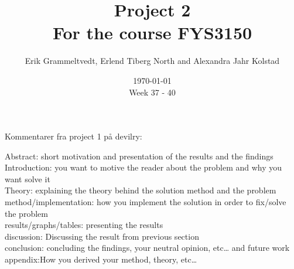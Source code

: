 \documentclass{article}
\begin{document}
\addtocounter{page}{0}

\title{Project 2 \\
      \large For the course FYS3150}
\date{\today \\
    \vspace{1mm}
    \large Week 37 - 40}

\author{Erik Grammeltvedt, Erlend Tiberg North and Alexandra Jahr Kolstad}

\maketitle


\vspace{1cm}

\tableofcontents

\vspace{1cm}


\newpage
\clearpage

Kommentarer fra project 1 på devilry:

Abstract: short motivation and presentation of the results and the findings \\

Introduction: you want to motive the reader about the problem and why you want solve it \\

Theory: explaining the theory behind the solution method and the problem \\

method/implementation: how you implement the solution in order to fix/solve the problem \\

results/graphs/tables: presenting the results \\

discussion: Discussing the result from previous section \\

conclusion: concluding the findings, your neutral opinion, etc… and future work \\

appendix:How you derived your method, theory, etc… \\

\vspace{2cm}
\end{document}
